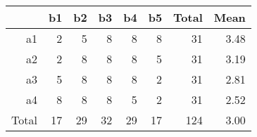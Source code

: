  \begin{center}
 \begin{tabular}{|r|rrrrr|rr|}
  \hline
     & b1 & b2 & b3 & b4 & b5 & Total & Mean \\ 
  \hline
  a1 & 2 & 5 & 8 & 8 & 8 & 31 & 3.48 \\ 
  a2 & 2 & 8 & 8 & 8 & 5 & 31 & 3.19 \\ 
  a3 & 5 & 8 & 8 & 8 & 2 & 31 & 2.81 \\ 
  a4 & 8 & 8 & 8 & 5 & 2 & 31 & 2.52 \\ 
  \hline
  Total & 17 & 29 & 32 & 29 & 17 & 124 & 3.00 \\ 
  \hline
 \end{tabular}
 \end{center}
